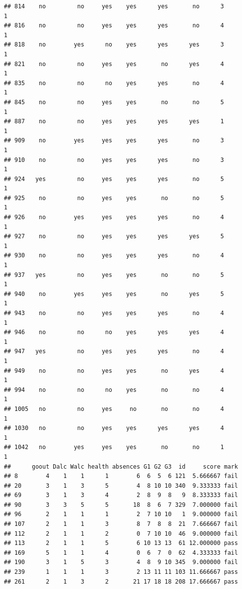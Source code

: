 \documentclass[]{article}
\begin{document}
\begin{verbatim}
## 814    no         no     yes    yes      yes       no      3        1
## 816    no         no     yes    yes      yes       no      4        1
## 818    no        yes      no    yes      yes      yes      3        1
## 821    no         no     yes    yes       no      yes      4        1
## 835    no         no      no    yes      yes       no      4        1
## 845    no         no     yes    yes       no       no      5        1
## 887    no         no     yes    yes      yes      yes      1        1
## 909    no        yes     yes    yes      yes       no      3        1
## 910    no         no     yes    yes      yes       no      3        1
## 924   yes         no     yes    yes      yes       no      5        1
## 925    no         no     yes    yes       no       no      5        1
## 926    no        yes     yes    yes      yes       no      4        1
## 927    no         no     yes    yes      yes      yes      5        1
## 930    no         no     yes    yes      yes       no      4        1
## 937   yes         no     yes    yes       no       no      5        1
## 940    no        yes     yes    yes       no      yes      5        1
## 943    no         no     yes    yes      yes       no      4        1
## 946    no         no      no    yes      yes      yes      4        1
## 947   yes         no     yes    yes      yes       no      4        1
## 949    no         no     yes    yes       no      yes      4        1
## 994    no         no      no    yes       no       no      4        1
## 1005   no         no     yes     no       no       no      4        1
## 1030   no         no     yes    yes      yes      yes      4        1
## 1042   no        yes     yes    yes       no       no      1        1
##      goout Dalc Walc health absences G1 G2 G3  id     score mark
## 8        4    1    1      1        6  6  5  6 121  5.666667 fail
## 20       3    1    3      5        4  8 10 10 340  9.333333 fail
## 69       3    1    3      4        2  8  9  8   9  8.333333 fail
## 90       3    3    5      5       18  8  6  7 329  7.000000 fail
## 96       2    1    1      1        2  7 10 10   1  9.000000 fail
## 107      2    1    1      3        8  7  8  8  21  7.666667 fail
## 112      2    1    1      2        0  7 10 10  46  9.000000 fail
## 113      2    1    1      5        6 10 13 13  61 12.000000 pass
## 169      5    1    1      4        0  6  7  0  62  4.333333 fail
## 190      3    1    5      3        4  8  9 10 345  9.000000 fail
## 239      1    1    1      3        2 13 11 11 103 11.666667 pass
## 261      2    1    3      2       21 17 18 18 208 17.666667 pass

\end{verbatim}
\end{document}
